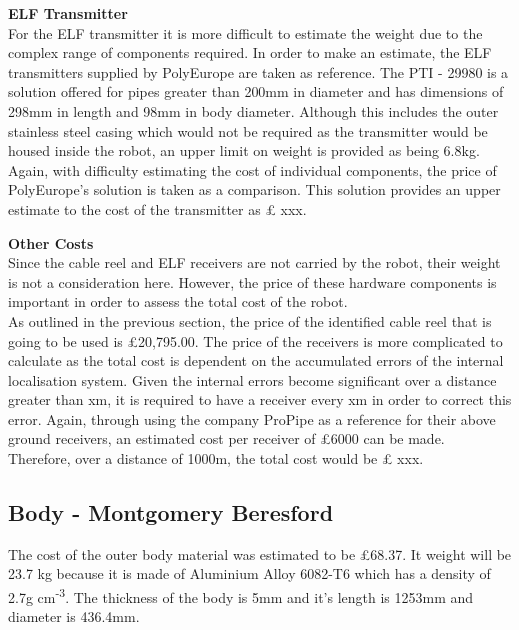\documentclass[11pt]{article}		%
\begin{document}
	        \textbf{ELF Transmitter}\\
	        For the ELF transmitter it is more difficult to estimate the weight due to the complex range of components required. In order to make an estimate, the ELF transmitters supplied by PolyEurope are taken as reference. The PTI - 29980 is a solution offered for pipes greater than 200mm in diameter and has dimensions of 298mm in length and 98mm in body diameter. Although this includes the outer stainless steel casing which would not be required as the transmitter would be housed inside the robot, an upper limit on weight is provided as being 6.8kg.\\
	        \hspace*{3ex}Again, with difficulty estimating the cost of individual components, the price of PolyEurope’s solution is taken as a comparison. This solution provides an upper estimate to the cost of the transmitter as £ xxx. 
	    
	        \textbf{Other Costs}\\
	
	        Since the cable reel and ELF receivers are not carried by the robot, their weight is not a consideration here. However, the price of these hardware components is important in order to assess the total cost of the robot. \\
		    \hspace*{3ex}As outlined in the previous section, the price of the identified cable reel that is going to be used is £20,795.00. The price of the receivers is more complicated to calculate as the total cost is dependent on the accumulated errors of the internal localisation system. Given the internal errors become significant over a distance greater than xm, it is required to have a receiver every xm in order to correct this error. Again, through using the company ProPipe as a reference for their above ground receivers, an estimated cost per receiver of £6000 can be made. Therefore, over a distance of 1000m, the total cost would be £ xxx. 
		    
		    
	    \subsection[Body]{Body - Montgomery Beresford}
		    
		    The cost of the outer body material was estimated to be £68.37. It weight will be 23.7 kg because it is made of Aluminium Alloy 6082-T6 which has a density of 2.7g cm\textsuperscript{-3}. The thickness of the body is 5mm and it's length is 1253mm and diameter is 436.4mm.
\end{document}
